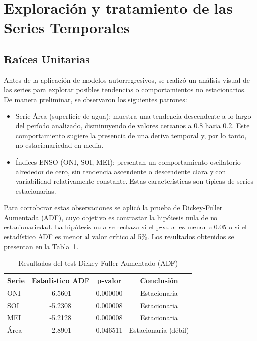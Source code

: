 \newpage
\section{Exploración y tratamiento de las Series Temporales}

\subsection{Raíces Unitarias}

Antes de la aplicación de modelos autorregresivos, se realizó un análisis visual de las 
series para explorar posibles tendencias o comportamientos no estacionarios. De manera 
preliminar, se observaron los siguientes patrones:

\begin{itemize}
    \item Serie Área (superficie de agua): muestra una tendencia descendente a lo 
    largo del período analizado, disminuyendo de valores cercanos a 0.8 hacia 0.2. Este 
    comportamiento sugiere la presencia de una deriva temporal y, por lo tanto, 
    no estacionariedad en media.
    \item Índices ENSO (ONI, SOI, MEI): presentan un comportamiento oscilatorio 
    alrededor de cero, sin tendencia ascendente o descendente clara y con variabilidad 
    relativamente constante. Estas características son típicas de series estacionarias.
\end{itemize}

Para corroborar estas observaciones se aplicó la prueba de Dickey-Fuller Aumentada (ADF), cuyo objetivo es contrastar la hipótesis nula de no estacionariedad. La hipótesis nula se rechaza si el p-valor es menor a 0.05 o si el estadístico ADF es menor al valor crítico al 5\%. Los resultados obtenidos se presentan en la Tabla~\ref{tab:adf_test}.

\begin{table}[H]
    \centering
    \caption{Resultados del test Dickey-Fuller Aumentado (ADF)}
    \label{tab:adf_test}
    \begin{tabular}{lccc}
        \toprule
        \textbf{Serie} & \textbf{Estadístico ADF} & \textbf{p-valor} & \textbf{Conclusión} \\
        \midrule
        ONI  & -6.5601 & 0.000000 & Estacionaria \\
        SOI  & -5.2308 & 0.000008 & Estacionaria \\
        MEI  & -5.2128 & 0.000008 & Estacionaria \\
        Área & -2.8901 & 0.046511 & Estacionaria (débil) \\
        \bottomrule
    \end{tabular}
\end{table}


